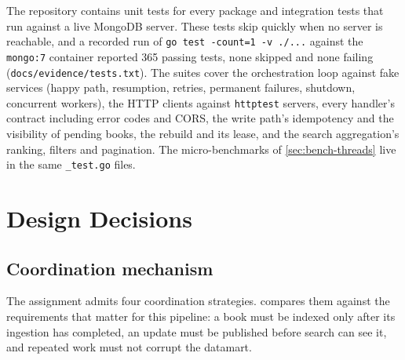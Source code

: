 \documentclass[10pt,a4paper]{article}
\newcommand{\code}[1]{\texttt{#1}}
\begin{document}
The repository contains unit tests for every package and integration tests that
run against a live MongoDB server. These tests skip quickly when no server is
reachable, and a recorded run of \code{go test -count=1 -v ./...} against the
\code{mongo:7} container reported 365 passing tests, none skipped and none
failing (\code{docs/evidence/\allowbreak tests.txt}). The suites cover the orchestration loop
against fake services (happy path, resumption, retries, permanent failures,
shutdown, concurrent workers), the HTTP clients against \code{httptest}
servers, every handler's contract including error codes and CORS, the write
path's idempotency and the visibility of pending books, the rebuild and its
lease, and the search aggregation's ranking, filters and pagination. The
micro-benchmarks of \cref{sec:bench-threads} live in the same
\code{\_test.go} files.

\section{Design Decisions}
\label{sec:design}

\subsection{Coordination mechanism}
\label{sec:decision-coordination}

The assignment admits four coordination strategies. 
compares them against the requirements that matter for this pipeline: a book
must be indexed only after its ingestion has completed, an update must be
published before search can see it, and repeated work must not corrupt the
datamart.
\end{document}

